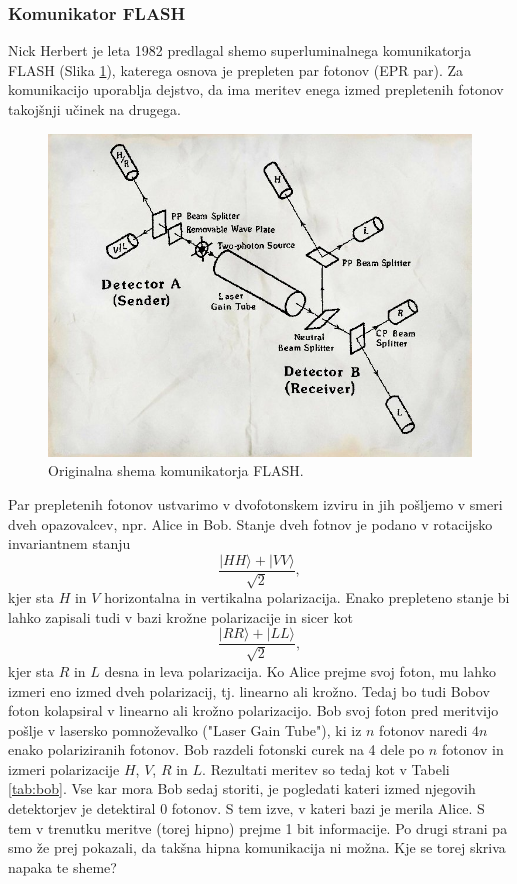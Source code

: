 \documentclass[12pt]{article}
\begin{document}
\subsubsection{Komunikator FLASH}

\par Nick Herbert je leta 1982 predlagal shemo superluminalnega komunikatorja FLASH (Slika \ref{fig:flash}), katerega osnova je prepleten par fotonov (EPR par). Za komunikacijo uporablja dejstvo, da ima meritev enega izmed prepletenih fotonov takojšnji učinek na drugega.

\begin{figure}[H]
\includegraphics[width=12cm]{flash.jpg}
\centering
\caption{Originalna shema komunikatorja FLASH. \cite{herbertFLASHSuperluminalCommunicator1982}}
\label{fig:flash}
\end{figure}
\par Par prepletenih fotonov ustvarimo v dvofotonskem izviru in jih pošljemo v smeri dveh opazovalcev, npr. Alice in Bob. Stanje dveh fotnov je podano v rotacijsko invariantnem stanju
\begin{equation}
\frac{| HH \rangle + | VV \rangle}{\sqrt{2}},
\end{equation}
kjer sta $H$ in $V$ horizontalna in vertikalna polarizacija. Enako prepleteno stanje bi lahko zapisali tudi v bazi krožne polarizacije in sicer kot
\begin{equation}
\frac{| RR \rangle + | LL \rangle}{\sqrt{2}},
\end{equation}
kjer sta $R$ in $L$ desna in leva polarizacija. Ko Alice prejme svoj foton, mu lahko izmeri eno izmed dveh polarizacij, tj. linearno ali krožno. Tedaj bo tudi Bobov foton kolapsiral v linearno ali krožno polarizacijo. Bob svoj foton pred meritvijo pošlje v lasersko pomnoževalko ("Laser Gain Tube"), ki iz $n$ fotonov naredi $4n$ enako polariziranih fotonov. Bob razdeli fotonski curek na 4 dele po $n$ fotonov in izmeri polarizacije $H$, $V$, $R$ in $L$. Rezultati meritev so tedaj kot v Tabeli \ref{tab:bob}. Vse kar mora Bob sedaj storiti, je pogledati kateri izmed njegovih detektorjev je detektiral 0 fotonov. S tem izve, v kateri bazi je merila Alice. S tem v trenutku meritve (torej hipno) prejme 1 bit informacije. Po drugi strani pa smo že prej pokazali, da takšna hipna komunikacija ni možna. Kje se torej skriva napaka te sheme? \cite{marcocerezoEntangledParticlesFaster2015}
\end{document}
